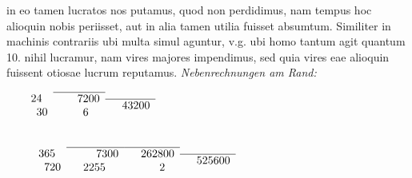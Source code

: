 in eo tamen lucratos nos putamus, quod non perdidimus,
nam tempus hoc alioquin nobis periisset, aut in alia tamen utilia fuisset absumtum.
Similiter in machinis\protect{} contrariis ubi multa simul aguntur,
v.g. ubi homo tantum agit quantum 10. nihil lucramur,
nam vires majores impendimus,
sed quia vires eae alioquin fuissent otiosae lucrum reputamus.
\pend
\vspace*{2em}
\pstart
\noindent
\textit{Nebenrechnungen am Rand:}
\pend
\vspace*{0.5em}
\pstart
\noindent
\begin{minipage}[t]{0.3\textwidth}
\vspace{-2.5mm}
$\begin{array}{ll}
& \, \, \, \, 24\\
& \, \, \, \, \, \, \, 30\end{array}\\
\begin{array}{ll}
\hline 
& \, \, \, \, 7200\\
& \, \, \, \, \, \, \, 6\end{array}\\
\begin{array}{ll}
\hline 
& 43200\end{array}$
\end{minipage}
\begin{minipage}[t]{0.3\textwidth}
\\
$\begin{array}{ll}
&\, \, \, \, \, \, \, \, 365
\\
&\, \, \,  \, \, \, \, \, \, \, \, 720\end{array}
\\
\begin{array}{ll}
\hline 
& \, \, \, \, \, \, \, 7300
\\
& 2255\end{array}
\\
\begin{array}{ll}
\hline 
& 262800
\\
& \, \, \, \, \, \, \, \, \, \, 2\end{array}\\
\begin{array}{ll}
\hline 
& 525600\end{array}$
\end{minipage}
\pend
\count{}